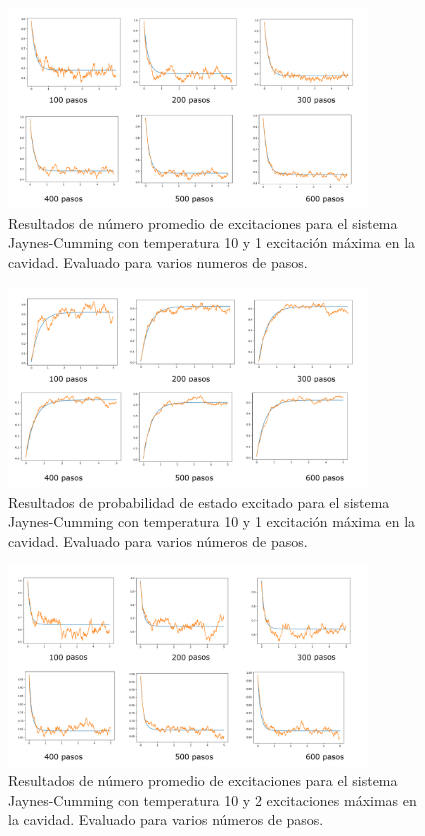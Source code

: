 \documentclass{book}
\begin{document}
\begin{figure}[ht]
    \includegraphics[width=0.85\textwidth]{test0_T10_pob0.png}
    \caption{Resultados de número promedio de excitaciones para el sistema Jaynes-Cumming con temperatura 10 y  1 excitación máxima en la cavidad. Evaluado para varios numeros de pasos.}
\end{figure}

\begin{figure}[ht]
    \includegraphics[width=0.85\textwidth]{test0_T10_pobe.png}
    \caption{Resultados de probabilidad de estado excitado para el sistema Jaynes-Cumming con temperatura 10 y 1 excitación máxima en la cavidad. Evaluado para varios números de pasos.}
\end{figure}

\begin{figure}[ht]
    \includegraphics[width=0.85\textwidth]{test1_T10_pob0.png}
    \caption{Resultados de número promedio de excitaciones para el sistema Jaynes-Cumming con temperatura 10 y 2 excitaciones máximas en la cavidad. Evaluado para varios números de pasos.}
\end{figure}
\end{document}
